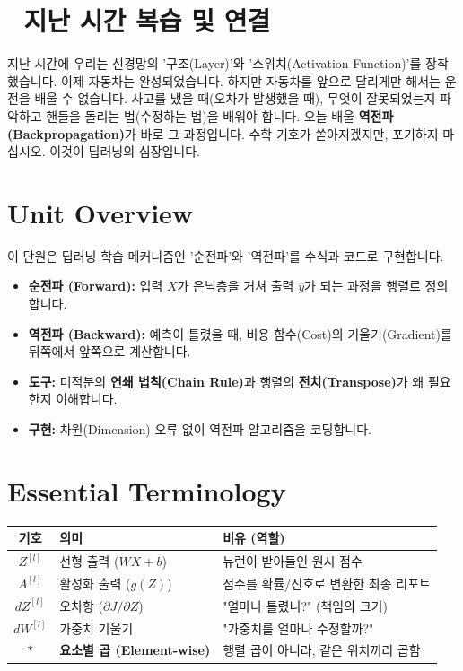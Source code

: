 \documentclass[11pt,a4paper]{book}
\theoremstyle{definition}
\begin{document}
\section*{🔗 지난 시간 복습 및 연결}
지난 시간에 우리는 신경망의 '구조(Layer)'와 '스위치(Activation Function)'를 장착했습니다. 이제 자동차는 완성되었습니다.
하지만 자동차를 앞으로 달리게만 해서는 운전을 배울 수 없습니다. 사고를 냈을 때(오차가 발생했을 때), 무엇이 잘못되었는지 파악하고 핸들을 돌리는 법(수정하는 법)을 배워야 합니다.
오늘 배울 \textbf{역전파(Backpropagation)}가 바로 그 과정입니다. 수학 기호가 쏟아지겠지만, 포기하지 마십시오. 이것이 딥러닝의 심장입니다.

\section{Unit Overview}
\begin{summarybox}[title={핵심 목표}]
이 단원은 딥러닝 학습 메커니즘인 '순전파'와 '역전파'를 수식과 코드로 구현합니다.
\begin{itemize}
    \item \textbf{순전파 (Forward):} 입력 $X$가 은닉층을 거쳐 출력 $\hat{y}$가 되는 과정을 행렬로 정의합니다.
    \item \textbf{역전파 (Backward):} 예측이 틀렸을 때, 비용 함수(Cost)의 기울기(Gradient)를 뒤쪽에서 앞쪽으로 계산합니다.
    \item \textbf{도구:} 미적분의 \textbf{연쇄 법칙(Chain Rule)}과 행렬의 \textbf{전치(Transpose)}가 왜 필요한지 이해합니다.
    \item \textbf{구현:} 차원(Dimension) 오류 없이 역전파 알고리즘을 코딩합니다.
\end{itemize}
\end{summarybox}

\section{Essential Terminology}
\begin{center}
\begin{tabular}{|c|l|l|}
\hline
\textbf{기호} & \textbf{의미} & \textbf{비유 (역할)} \\ \hline
$Z^{[l]}$ & 선형 출력 ($WX+b$) & 뉴런이 받아들인 원시 점수 \\ \hline
$A^{[l]}$ & 활성화 출력 ($g(Z)$) & 점수를 확률/신호로 변환한 최종 리포트 \\ \hline
$dZ^{[l]}$ & 오차항 ($\partial J / \partial Z$) & "얼마나 틀렸니?" (책임의 크기) \\ \hline
$dW^{[l]}$ & 가중치 기울기 & "가중치를 얼마나 수정할까?" \\ \hline
$*$ & \textbf{요소별 곱 (Element-wise)} & 행렬 곱이 아니라, 같은 위치끼리 곱함 \\ \hline
\end{tabular}
\end{center}
\end{document}
